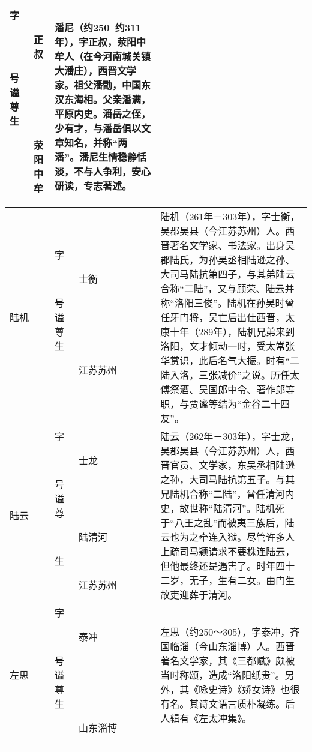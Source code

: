 \begin{longtable}{|>{\centering\namefont\heiti}m{2em}|>{\centering\tiny}m{3.0em}|>{\xzfont\kaiti}m{7.3em}|}
\begin{description}
  \item[字] 正叔
  \item[号] 
  \item[谥] 
  \item[尊] 
  \item[生] 荥阳中牟
  \end{description} & 潘尼（约250~约311年），字正叔，荥阳中牟人（在今河南城关镇大潘庄），西晋文学家。祖父潘勖，中国东汉东海相。父亲潘满，平原内史。潘岳之侄，少有才，与潘岳俱以文章知名，并称“两潘”。潘尼生情稳静恬淡，不与人争利，安心研读，专志著述。 \tabularnewline\hline
  陆机 & \begin{description}
  \item[字] 士衡
  \item[号] 
  \item[谥] 
  \item[尊] 
  \item[生] 江苏苏州
  \end{description} & 陆机（261年－303年），字士衡，吴郡吴县（今江苏苏州）人。西晋著名文学家、书法家。出身吴郡陆氏，为孙吴丞相陆逊之孙、大司马陆抗第四子，与其弟陆云合称“二陆”，又与顾荣、陆云并称“洛阳三俊”。陆机在孙吴时曾任牙门将，吴亡后出仕西晋，太康十年（289年），陆机兄弟来到洛阳，文才倾动一时，受太常张华赏识，此后名气大振。时有“二陆入洛，三张减价”之说。历任太傅祭酒、吴国郎中令、著作郎等职，与贾谧等结为“金谷二十四友”。 \tabularnewline\hline
  陆云 & \begin{description}
  \item[字] 士龙
  \item[号] 
  \item[谥] 
  \item[尊] 陆清河
  \item[生] 江苏苏州
  \end{description} & 陆云（262年－303年），字士龙，吴郡吴县（今江苏苏州）人，西晋官员、文学家，东吴丞相陆逊之孙，大司马陆抗第五子。与其兄陆机合称“二陆”，曾任清河内史，故世称“陆清河”。陆机死于“八王之乱”而被夷三族后，陆云也为之牵连入狱。尽管许多人上疏司马颖请求不要株连陆云，但他最终还是遇害了。时年四十二岁，无子，生有二女。由门生故吏迎葬于清河。 \tabularnewline\hline
  左思 & \begin{description}
  \item[字] 泰冲
  \item[号] 
  \item[谥] 
  \item[尊] 
  \item[生] 山东淄博
  \end{description} & 左思（约250～305），字泰冲，齐国临淄（今山东淄博）人。西晋著名文学家，其《三都赋》颇被当时称颂，造成“洛阳纸贵”。另外，其《咏史诗》《娇女诗》也很有名。其诗文语言质朴凝练。后人辑有《左太冲集》。 \tabularnewline\hline

\end{longtable}
